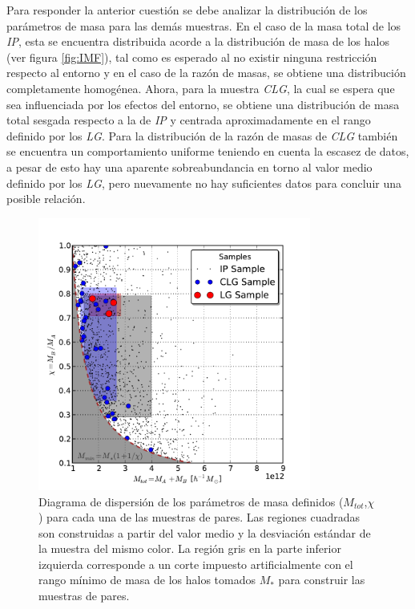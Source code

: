 Para responder la anterior cuestión se debe analizar la distribución de
los pará\-metros de masa para las demás muestras. En el caso de la masa
total de los \textit{IP}, esta se encuentra distribuida acorde a 
la distribución de masa de los halos (ver figura \ref{fig:IMF}), tal 
como es esperado al no existir ninguna restricción respecto al 
entorno y en el caso de la razón de masas, se obtiene una distribución
completamente homogénea. Ahora, para la muestra \textit{CLG}, la cual se 
espera que sea influenciada por los efectos del entorno, se obtiene una 
distribución de masa total sesgada respecto a la de \textit{IP} y centrada 
aproximadamente en el rango definido por los \textit{LG}. Para la 
distribución de la razón de masas de \textit{CLG} también se encuentra 
un comportamiento uniforme teniendo en cuenta la escasez de datos, 
a pesar de esto hay una aparente sobreabundancia en torno al valor medio 
definido por los \textit{LG}, pero nuevamente no hay suficientes datos 
para concluir una posible relación.

\newpage
\begin{figure}[htbp]
	\centering
	\includegraphics[trim = 0mm 0mm 0mm 10mm, clip, width=0.8\textwidth]
	{./figures/4_results/IP_Mass_vs_Ratio.pdf}
	
	\caption{\small{Diagrama de dispersión de los parámetros de masa 
	definidos ($M_{tot}$,$\chi$) para cada una de las muestras de pares.
	Las regiones cuadradas son construidas a partir del valor medio y la
	desviación estándar de la muestra del mismo color.
	La región gris en la parte inferior izquierda corresponde a un corte
	impuesto artificialmente con el rango mínimo de masa de los halos 
	tomados $M_*$ para construir las muestras de pares.}}
	\label{fig:Dispersion_Mass_CLG}
\end{figure}


